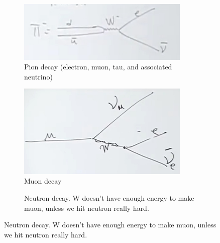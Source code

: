 \documentclass[]{article}
\begin{document}
\begin{figure}[H]
	\caption{Examples of W boson mediated decays}
	\begin{subfigure}[t]{0.30\textwidth}
		\caption{Pion decay (electron, muon, tau, and associated neutrino)}
		\includegraphics[width=0.9\textwidth]{2-5-pion-decay}
	\end{subfigure}
	\begin{subfigure}[t]{0.30\textwidth}
		\caption{Muon decay}
		\includegraphics[width=0.9\textwidth]{2-5-muon-decay}
	\end{subfigure}
	\begin{subfigure}[t]{0.30\textwidth}
		\caption{Neutron decay. W doesn't have enough energy to make muon, unless we hit neutron really hard.}

\end{subfigure}
\end{figure}
\end{document}
